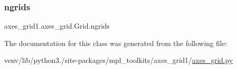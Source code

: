 \subsubsection{\texorpdfstring{ngrids}{ngrids}}
{\footnotesize\ttfamily axes\+\_\+grid1.\+axes\+\_\+grid.\+Grid.\+ngrids}



The documentation for this class was generated from the following file\+:\begin{DoxyCompactItemize}
\item 
venv/lib/python3./site-\/packages/mpl\+\_\+toolkits/axes\+\_\+grid1/\hyperlink{axes__grid1_2axes__grid_8py}{axes\+\_\+grid.\+py}\end{DoxyCompactItemize}

